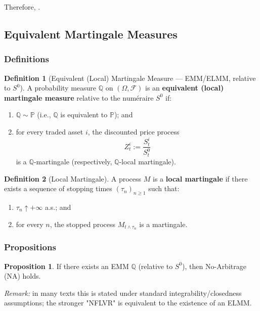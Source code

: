 \documentclass[12pt,a4paper]{article}
\theoremstyle{definition}
\newtheorem{definition}{Definition}[section]
\newtheorem{proposition}{Proposition}[section]
\begin{document}
Therefore, .

\subsection{Equivalent Martingale Measures}

\subsubsection{Definitions}

\begin{definition}[Equivalent (Local) Martingale Measure — EMM/ELMM, relative to $S^0$]
A probability measure $\mathbb{Q}$ on $(\Omega, \mathcal{F})$ is an \textbf{equivalent (local) martingale measure} relative to the numéraire $S^0$ if:
\begin{enumerate}
\item $\mathbb{Q} \sim \mathbb{P}$ (i.e., $\mathbb{Q}$ is equivalent to $\mathbb{P}$); and
\item for every traded asset $i$, the discounted price process
\[
Z_t^i := \frac{S_t^i}{S_t^0}
\]
is a $\mathbb{Q}$-martingale (respectively, $\mathbb{Q}$-local martingale).
\end{enumerate}
\end{definition}

\begin{definition}[Local Martingale]
A process $M$ is a \textbf{local martingale} if there exists a sequence of stopping times $(\tau_n)_{n \geq 1}$ such that:
\begin{enumerate}
\item $\tau_n \uparrow +\infty$ a.s.; and
\item for every $n$, the stopped process $M_{t \wedge \tau_n}$ is a martingale.
\end{enumerate}
\end{definition}

\subsubsection{Propositions}

\begin{proposition}
If there exists an EMM $\mathbb{Q}$ (relative to $S^0$), then No-Arbitrage (NA) holds.

\textit{Remark:} in many texts this is stated under standard integrability/closedness assumptions; the stronger "NFLVR" is equivalent to the existence of an ELMM.
\end{proposition}
\end{document}
